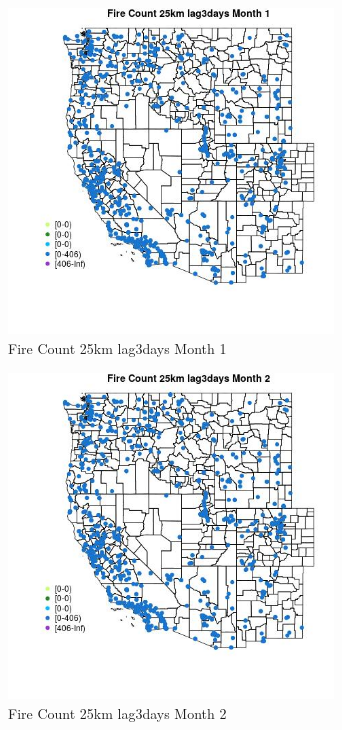 \begin{figure} 
\centering  
\includegraphics[width=0.77\textwidth]{Code_Outputs/Report_ML_input_PM25_Step4_part_f_de_duplicated_aveswNAs_MapObsMo1Fire_Count_25km_lag3days.jpg} 
\caption{\label{fig:Report_ML_input_PM25_Step4_part_f_de_duplicated_aveswNAsMapObsMo1Fire_Count_25km_lag3days}Fire Count 25km lag3days Month 1} 
\end{figure} 
 

\begin{figure} 
\centering  
\includegraphics[width=0.77\textwidth]{Code_Outputs/Report_ML_input_PM25_Step4_part_f_de_duplicated_aveswNAs_MapObsMo2Fire_Count_25km_lag3days.jpg} 
\caption{\label{fig:Report_ML_input_PM25_Step4_part_f_de_duplicated_aveswNAsMapObsMo2Fire_Count_25km_lag3days}Fire Count 25km lag3days Month 2} 
\end{figure} 
 

